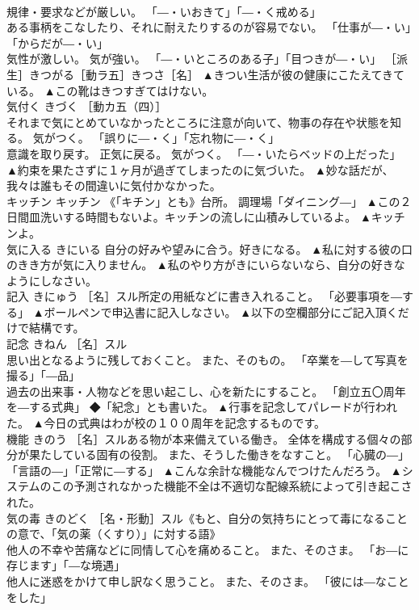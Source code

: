 \documentclass[8pt]{extreport}
\begin{document}
\begin{CJK}{UTF8}{min}
\\	規律・要求などが厳しい。 「―・いおきて」「―・く戒める」 
\\	ある事柄をこなしたり、それに耐えたりするのが容易でない。 「仕事が―・い」「からだが―・い」 
\\	気性が激しい。 気が強い。 「―・いところのある子」「目つきが―・い」 ［派生］きつがる［動ラ五］きつさ［名］	▲きつい生活が彼の健康にこたえてきている。 ▲この靴はきつすぎてはけない。
\\	気付く	きづく	［動カ五（四）］ 
\\	それまで気にとめていなかったところに注意が向いて、物事の存在や状態を知る。 気がつく。 「誤りに―・く」「忘れ物に―・く」 
\\	意識を取り戻す。 正気に戻る。 気がつく。 「―・いたらベッドの上だった」	▲約束を果たさずに１ヶ月が過ぎてしまったのに気づいた。 ▲妙な話だが、我々は誰もその間違いに気付かなかった。
\\	キッチン	キッチン	《「キチン」とも》台所。 調理場「ダイニング―」	▲この２日間皿洗いする時間もないよ。キッチンの流しに山積みしているよ。 ▲キッチンよ。
\\	気に入る	きにいる	自分の好みや望みに合う。好きになる。	▲私に対する彼の口のきき方が気に入りません。 ▲私のやり方がきにいらないなら、自分の好きなようにしなさい。
\\	記入	きにゅう	［名］スル所定の用紙などに書き入れること。 「必要事項を―する」	▲ボールペンで申込書に記入しなさい。 ▲以下の空欄部分にご記入頂くだけで結構です。
\\	記念	きねん	［名］スル 
\\	思い出となるように残しておくこと。 また、そのもの。 「卒業を―して写真を撮る」「―品」 
\\	過去の出来事・人物などを思い起こし、心を新たにすること。 「創立五〇周年を―する式典」 ◆「紀念」とも書いた。	▲行事を記念してパレードが行われた。 ▲今日の式典はわが校の１００周年を記念するものです。
\\	機能	きのう	［名］スルある物が本来備えている働き。 全体を構成する個々の部分が果たしている固有の役割。 また、そうした働きをなすこと。 「心臓の―」「言語の―」「正常に―する」	▲こんな余計な機能なんでつけたんだろう。 ▲システムのこの予測されなかった機能不全は不適切な配線系統によって引き起こされた。
\\	気の毒	きのどく	［名・形動］スル《もと、自分の気持ちにとって毒になることの意で、「気の薬（くすり）」に対する語》 
\\	他人の不幸や苦痛などに同情して心を痛めること。 また、そのさま。 「お―に存じます」「―な境遇」 
\\	他人に迷惑をかけて申し訳なく思うこと。 また、そのさま。 「彼には―なことをした」 

\end{CJK}
\end{document}
